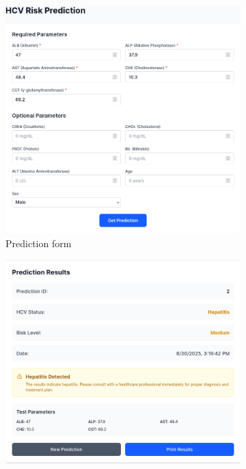 \begin{figure}[htbp]
  \begin{subfigure}{0.5\textwidth}
    \includegraphics[width=\textwidth]{figures/site/predict1.png} 
    \caption{Prediction form}
    \label{fig:form}
  \end{subfigure}
  \begin{subfigure}{0.5\textwidth}
    \includegraphics[width=\textwidth]{figures/site/predict2.png}

\end{subfigure}
\end{figure}
